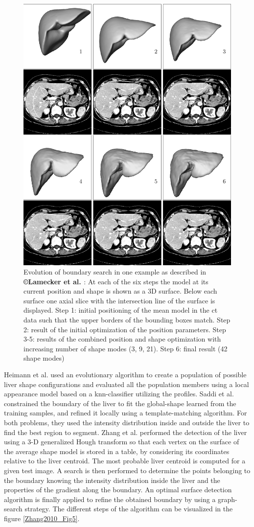 \begin{figure}[ht!]
	\centering
	\includegraphics[width=0.6\linewidth]{images/Lamecker2004_Fig9}
	\caption{Evolution of boundary search in one example as described in \textbf{©Lamecker et al. \cite{Lamecker2004}}: At each of the six steps the model at its current position and shape is shown as a 3D surface. Below each surface one axial slice with the intersection line of the surface is displayed. Step 1: initial positioning of the mean model in the \ac{ct} data such that the upper borders of the bounding boxes match. Step 2: result of the initial optimization of the position parameters. Step 3-5: results of the combined position and shape optimization with increasing number of shape modes (3, 9, 21). Step 6: final result (42 shape modes)}
	\label{Lamecker2004_Fig9}
\end{figure}


Heimann et al. \cite{Heimann2007} used an evolutionary algorithm to create a population of
possible liver shape configurations and evaluated all the population members
using a local appearance model based on a \ac{knn}-classifier utilizing the
profiles.  Saddi et al. \cite{Saddi2007} constrained the boundary of the liver to fit the
global-shape learned from the training samples, and refined it locally
using a template-matching algorithm. For both problems, they used the
intensity distribution inside and outside the liver to find the best
region to segment. Zhang et al. \cite{Zhang2010} performed the detection of the liver using a 3-D
generalized Hough transform so that each vertex on the surface of the
average shape model is stored in a table, by considering its coordinates
relative to the liver centroid. The most probable liver centroid is
computed for a given test image. A search is then performed to determine
the points belonging to the boundary knowing the intensity distribution
inside the liver and the properties of the gradient along the boundary.
An optimal surface detection algorithm is finally applied to refine the
obtained boundary by using a graph-search strategy. The different steps
of the algorithm can be visualized in the figure \ref{Zhang2010_Fig5}.

